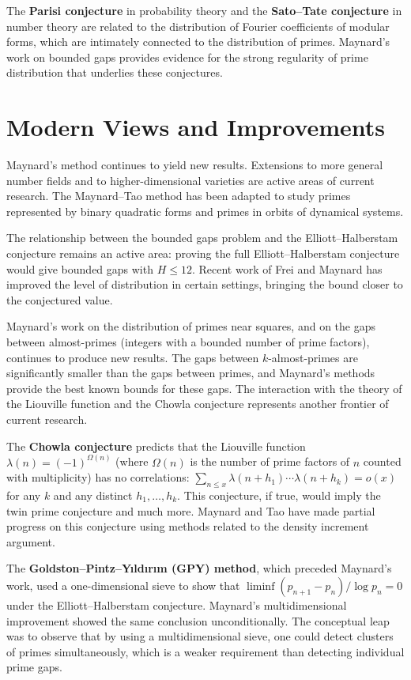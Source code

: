 The \textbf{Parisi conjecture} in probability theory and the \textbf{Sato--Tate conjecture} in number theory are related to the distribution of Fourier coefficients of modular forms, which are intimately connected to the distribution of primes. Maynard's work on bounded gaps provides evidence for the strong regularity of prime distribution that underlies these conjectures.

\section{Modern Views and Improvements}

Maynard's method continues to yield new results. Extensions to more general number fields and to higher-dimensional varieties are active areas of current research. The Maynard--Tao method has been adapted to study primes represented by binary quadratic forms and primes in orbits of dynamical systems.

The relationship between the bounded gaps problem and the Elliott--Halberstam conjecture remains an active area: proving the full Elliott--Halberstam conjecture would give bounded gaps with $H \le 12$. Recent work of Frei and Maynard has improved the level of distribution in certain settings, bringing the bound closer to the conjectured value.

Maynard's work on the distribution of primes near squares, and on the gaps between almost-primes (integers with a bounded number of prime factors), continues to produce new results. The gaps between $k$-almost-primes are significantly smaller than the gaps between primes, and Maynard's methods provide the best known bounds for these gaps. The interaction with the theory of the Liouville function and the Chowla conjecture represents another frontier of current research.

The \textbf{Chowla conjecture} predicts that the Liouville function $\lambda(n) = (-1)^{\Omega(n)}$ (where $\Omega(n)$ is the number of prime factors of $n$ counted with multiplicity) has no correlations: $\sum_{n \le x} \lambda(n+h_1) \cdots \lambda(n+h_k) = o(x)$ for any $k$ and any distinct $h_1, \ldots, h_k$. This conjecture, if true, would imply the twin prime conjecture and much more. Maynard and Tao have made partial progress on this conjecture using methods related to the density increment argument.

The \textbf{Goldston--Pintz--Y{\i}ld{\i}r{\i}m (GPY) method}, which preceded Maynard's work, used a one-dimensional sieve to show that $\liminf (p_{n+1} - p_n) / \log p_n = 0$ under the Elliott--Halberstam conjecture. Maynard's multidimensional improvement showed the same conclusion unconditionally. The conceptual leap was to observe that by using a multidimensional sieve, one could detect clusters of primes simultaneously, which is a weaker requirement than detecting individual prime gaps.

